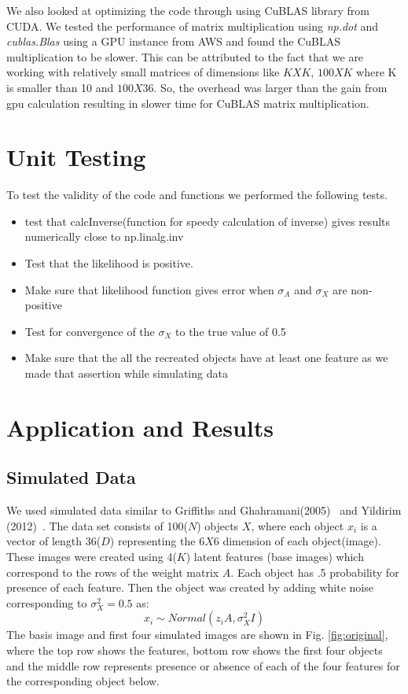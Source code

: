 \documentclass{article}
\begin{document}
We also looked at optimizing the code through using CuBLAS library from CUDA. We tested the performance of matrix multiplication using \textit{np.dot} and \textit{cublas.Blas} using a GPU instance from AWS and found the CuBLAS multiplication to be slower. This can be attributed to the fact that we are working with relatively small matrices of dimensions like $KXK$, $100XK$ where K is smaller than 10 and  $100X36$. So, the overhead was larger than the gain from gpu calculation resulting in slower time for CuBLAS matrix multiplication.


\section{Unit Testing}
To test the validity of the code and functions we performed the following tests.

\begin{itemize}
\item{test that calcInverse(function for speedy calculation of inverse) gives results numerically close to np.linalg.inv}
\item{Test that the likelihood is positive.}
\item{Make sure that likelihood function gives error when $\sigma_A$ and $\sigma_X$ are non-positive}
\item{Test for convergence of the $\sigma_X$ to the true value of 0.5}
\item{Make sure that the all the recreated objects have at least one feature as we made that assertion while simulating data}
\end{itemize}

\section{Application and Results}
\subsection{Simulated Data}
We used simulated data similar to Griffiths and Ghahramani(2005)~\cite{griffiths} and Yildirim (2012)~\cite{yildirim}. The data set consists of 100($N$) objects $X$, where each object $x_i$ is a vector of length 36($D$) representing the $6X6$ dimension of each object(image). These images were created using 4($K$) latent features (base images) which correspond to the rows of the weight matrix $A$. Each object has .5 probability for presence of each feature. Then the object was created by adding white noise corresponding to $\sigma_X^2=0.5$ as:
\[
x_i \sim Normal(z_iA, \sigma_X^2I)
\]
The basis image and first four simulated images are shown in Fig. \ref{fig:original}, where the top row shows the features, bottom row shows the first four objects and the middle row represents presence or absence of each of the four features for the corresponding object below.\\
\end{document}
